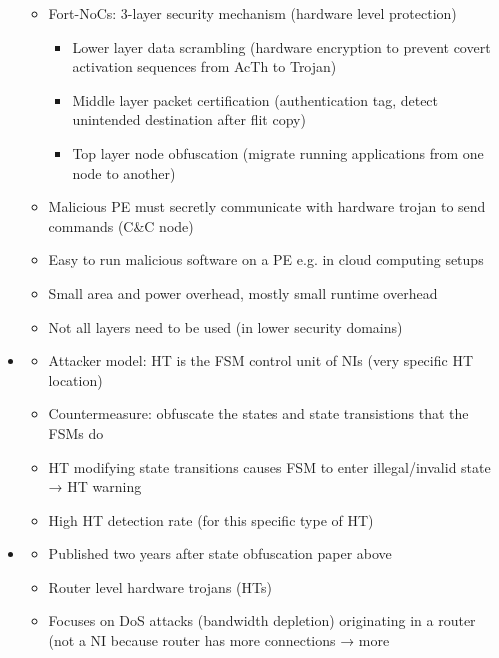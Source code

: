 \documentclass[
	paper=a4,
	fontsize=11pt,
	parskip=full %
]{scrreprt}
\begin{document}
\begin{itemize}
\begin{itemize}
                \item Fort-NoCs: 3-layer security mechanism (hardware level protection)
                    \begin{itemize}
                        \item Lower layer data scrambling (hardware encryption to prevent covert activation sequences from AcTh to Trojan)
                        \item Middle layer packet certification (authentication tag, detect unintended destination after flit copy)
                        \item Top layer node obfuscation (migrate running applications from one node to another)
                    \end{itemize}
                \item Malicious PE must secretly communicate with hardware trojan to send commands (C\&C node)
                \item Easy to run malicious software on a PE e.g. in cloud computing setups
                \item Small area and power overhead, mostly small runtime overhead
                \item Not all layers need to be used (in lower security domains)
            \end{itemize}
        \item \textbf{}
            \begin{itemize}
                \item Attacker model: HT is the FSM control unit of NIs (very specific HT location)
                \item Countermeasure: obfuscate the states and state transistions that the FSMs do
                \item HT modifying state transitions causes FSM to enter illegal/invalid state → HT warning
                \item High HT detection rate (for this specific type of HT)
            \end{itemize}
        \item \textbf{}
            \begin{itemize}
                \item Published two years after state obfuscation paper above
                \item Router level hardware trojans (HTs)
                \item Focuses on DoS attacks (bandwidth depletion) originating in a router (not a NI because router has more connections → more

\end{itemize}
\end{itemize}
\end{document}

